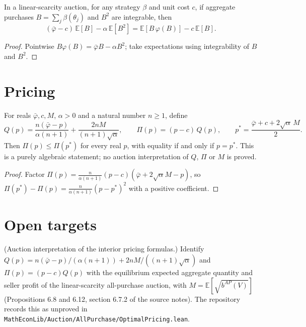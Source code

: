 \begin{theorem}\label{thm:MathEconLib.LinearScarcityAuction.bundledEditionWelfare_eq}
\leanok
{}
In a linear-scarcity auction, for any strategy $\beta$ and unit cost $c$, if aggregate purchases $B = \sum_j \beta(\theta_j)$ and $B^2$ are integrable, then
\[
  (\bar\varphi - c)\,\mathbb E[B] - \alpha\,\mathbb E[B^2] = \mathbb E[B\,\varphi(B)] - c\,\mathbb E[B].
\]
\end{theorem}
\begin{proof}
\leanok
{}
Pointwise $B\varphi(B) = \bar\varphi B - \alpha B^2$; take expectations using integrability of $B$ and $B^2$.
\end{proof}

\section{Pricing}

\begin{theorem}\label{thm:MathEconLib.AllPurchase.sellerProfitInterior_le_at_optimal}
\leanok
For reals $\bar\varphi, c, M$, $\alpha > 0$ and a natural number $n \ge 1$, define
\[
  Q(p) = \frac{n(\bar\varphi - p)}{\alpha(n+1)} + \frac{2nM}{(n+1)\sqrt\alpha},\qquad \Pi(p) = (p-c)\,Q(p),\qquad p^* = \frac{\bar\varphi + c + 2\sqrt\alpha\, M}{2}.
\]
Then $\Pi(p) \le \Pi(p^*)$ for every real $p$, with equality if and only if $p = p^*$. This is a purely algebraic statement; no auction interpretation of $Q$, $\Pi$ or $M$ is proved.
\end{theorem}
\begin{proof}
\leanok
Factor $\Pi(p) = \frac{n}{\alpha(n+1)}(p-c)(\bar\varphi + 2\sqrt\alpha M - p)$, so $\Pi(p^*) - \Pi(p) = \frac{n}{\alpha(n+1)}(p - p^*)^2$ with a positive coefficient.
\end{proof}

\section{Open targets}

\begin{theorem}\label{thm:open.interior_pricing_interpretation}
(Auction interpretation of the interior pricing formulas.) Identify $Q(p) = n(\bar\varphi - p)/(\alpha(n+1)) + 2nM/((n+1)\sqrt\alpha)$ and $\Pi(p) = (p-c)Q(p)$ with the equilibrium expected aggregate quantity and seller profit of the linear-scarcity all-purchase auction, with $M = \mathbb E[\sqrt{b^{AP}(V)}]$ (Propositions 6.8 and 6.12, section 6.7.2 of the source notes). The repository records this as unproved in \texttt{MathEconLib/Auction/AllPurchase/OptimalPricing.lean}.
\end{theorem}

